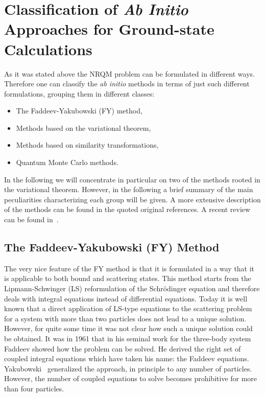 
\section{Classification of {\it Ab Initio} Approaches for Ground-state Calculations}\label{sec:CLASS}
As it was stated above the NRQM problem can be formulated in different ways. Therefore one can 
classify the {\it ab initio} methods in terms of just such different formulations, grouping them in different classes:
\begin{itemize} 
 \item  The Faddeev-Yakubowski (FY) method,
 \item  Methods based on the variational theorem,
 \item  Methods based on similarity transformations,
 \item  Quantum Monte Carlo methods.
\end{itemize}
In the following we will concentrate in particular on two of the methods rooted in the  variational theorem. However, in the following
a brief summary of the main peculiarities characterizing each group will be given. 
A more extensive description of the methods can be found in the quoted original references. A recent review can be found in~\cite{WlO12}. 
 
 \subsection{The Faddeev-Yakubowski (FY) Method}\label{sec:FY}
The very nice feature of the 
FY method is that it is formulated in a way that it is applicable to both bound and scattering states.
This method starts from the Lipmann-Schwinger (LS) reformulation 
of the Schr\"odinger equation and therefore deals with integral equations instead of differential equations. 
Today it is well known that a direct application of LS-type equations to the scattering problem for a system with more than two particles
does not lead to a unique solution. However, for quite some time  it was not clear 
how such a unique solution could be obtained. It was in 1961 that in his seminal work for the three-body system~\cite{FADDEEV:1961} Faddeev
showed how the problem can be solved. He derived the right set of coupled integral equations which
have taken his name: the Faddeev equations. 
Yakubowski~\cite{YAKUBOWSKY:1967} generalized the approach, in principle to any number of particles. However, 
the number of coupled equations to solve becomes prohibitive for more than four particles. 
 
